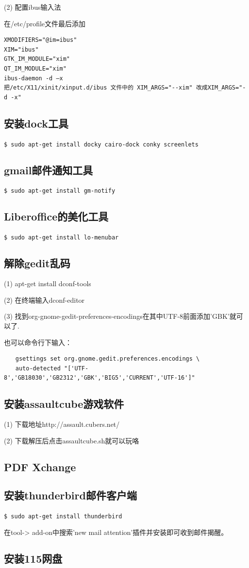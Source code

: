 (2) 配置ibus输入法

在/etc/profile文件最后添加
\begin{verbatim}
XMODIFIERS="@im=ibus"
XIM="ibus"
GTK_IM_MODULE="xim"
QT_IM_MODULE="xim"
ibus-daemon -d –x
把/etc/X11/xinit/xinput.d/ibus 文件中的 XIM_ARGS="--xim" 改成XIM_ARGS="-d -x"
\end{verbatim}

\subsection{安装dock工具}
\verb"$ sudo apt-get install docky cairo-dock conky screenlets"

\subsection{gmail邮件通知工具}
\verb"$ sudo apt-get install gm-notify"

\subsection{Liberoffice的美化工具}
\verb"$ sudo apt-get install lo-menubar"

\subsection{解除gedit乱码}
(1) apt-get install dconf-tools

(2) 在终端输入dconf-editor

(3) 找到org-gnome-gedit-preferences-encodings在其中UTF-8前面添加’GBK’就可以了.

也可以命令行下输入：
\begin{verbatim}
　　gsettings set org.gnome.gedit.preferences.encodings \ 
　　auto-detected "['UTF-8','GB18030','GB2312','GBK','BIG5','CURRENT','UTF-16']"
\end{verbatim}

\subsection{安装assaultcube游戏软件}
(1) 下载地址http://assault.cubers.net/

(2) 下载解压后点击assaultcube.sh就可以玩咯

\subsection{PDF Xchange}

\subsection{安装thunderbird邮件客户端}
\verb"$ sudo apt-get install thunderbird"

在tool-> add-on中搜索’new mail attention’插件并安装即可收到邮件揭醒。

\subsection{安装115网盘}
